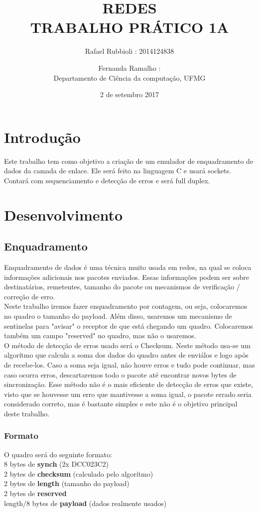 \documentclass[12pt]{article}
\title{\LARGE \textbf{\uppercase{REDES\\Trabalho prático 1A}} }
\date{2 de setembro 2017}
\author{Rafael Rubbioli : 2014124838\\
\and Fernanda Ramalho : \\ Departamento de Ciência da computação, UFMG}
\begin{document}
	\maketitle 
	\section{Introdução}
		Este trabalho tem como objetivo a criação de um emulador de enquadramento de dados da camada de enlace. Ele será feito na linguagem C e usará sockets. Contará com sequenciamento e detecção de erros e será full duplex.
	\section{Desenvolvimento}
		\subsection{Enquadramento}
			Enquadramento de dados é uma técnica muito usada em redes, na qual se coloca informações adicionais nos pacotes enviados. Essas informações podem ser sobre destinatários, remetentes, tamanho do pacote ou mecanismos de verificação / correção de erro. 
			\\ Neste trabalho iremos fazer enquadramento por contagem, ou seja, colocaremos no quadro o tamanho do payload. Além disso, usaremos um mecanismo de sentinelas para "avisar" o receptor de que está chegando um quadro. Colocaremos também um campo "reserved" no quadro, mas não o usaremos.
			\\ O método de detecção de erros usado será o Checksum. Neste método usa-se um algorítmo que calcula a soma dos dados do quadro antes de enviálos e logo após de recebe-los. Caso a soma seja igual, não houve erros e tudo pode continuar, mas caso ocorra erros, descartaremos todo o pacote até encontrar novos bytes de sincronização. Esse método não é o mais eficiente de detecção de erros que existe, visto que se houvesse um erro que mantivesse a soma igual, o pacote errado seria considerado correto, mas é bastante simples e este não é o objetivo principal deste trabalho.
			\subsubsection{Formato}
			O quadro será do seguinte formato: 
			\\8 bytes de \textbf{synch} (2x DCC023C2)
			\\2 bytes de \textbf{checksum} (calculado pelo algorítmo)
			\\2 bytes de \textbf{length}  (tamanho do payload)
			\\2 bytes de \textbf{reserved}
			\\length/8 bytes de \textbf{payload} (dados realmente usados)
\end{document}

